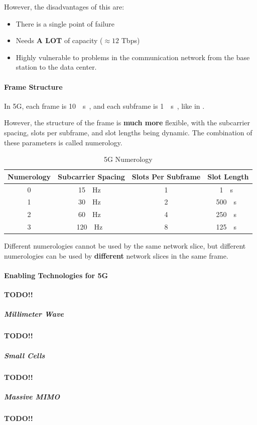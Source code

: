 However, the disadvantages of this are:
\begin{itemize}[noitemsep]
\item There is a single point of failure
\item Needs \textbf{A LOT} of capacity ($\approx 12$ Tbps)
\item Highly vulnerable to problems in the communication network from the base station to the data center.
\end{itemize}

\paragraph{Frame Structure}\label{par:Frame_Structure}
In 5G, each frame is \SI{10}{\milli{} \second{}}, and each subframe is \SI{1}{\milli{} \second{}}, like in .

However, the structure of the frame is \textbf{much more} flexible, with the subcarrier spacing, slots per subframe, and slot lengths being dynamic.
The combination of these parameters is called numerology.

\begin{table}[h!tbp]
  \centering
  \begin{tabular}{cccc}
    \toprule
    \textbf{Numerology} & \textbf{Subcarrier Spacing} & \textbf{Slots Per Subframe} & \textbf{Slot Length} \\
    \midrule
    0 & \SI{15}{\kilo{} \hertz{}} & 1 & \SI{1}{\milli{} \second{}} \\
    1 & \SI{30}{\kilo{} \hertz{}} & 2 & \SI{500}{\micro{} \second{}} \\
    2 & \SI{60}{\kilo{} \hertz{}} & 4 & \SI{250}{\micro{} \second{}} \\
    3 & \SI{120}{\kilo{} \hertz{}} & 8 & \SI{125}{\micro{} \second{}} \\
    \bottomrule
  \end{tabular}
  \caption{5G Numerology}
  \label{tab:5G_Numerology}
\end{table}

\begin{remark*}
  Different numerologies cannot be used by the same network slice, but different numerologies can be used by \textbf{different} network slices in the same frame.
\end{remark*}


\paragraph{Enabling Technologies for 5G}\label{par:5G_Enabling_Technologies}
\textbf{TODO!!}

\subparagraph{Millimeter Wave}\label{subpar:Millimeter_Wave}
\textbf{TODO!!}

\subparagraph{Small Cells}\label{subpar:Small_Cells}
\textbf{TODO!!}

\subparagraph{Massive MIMO}\label{subpar:Massive_MIMO}
\textbf{TODO!!}

